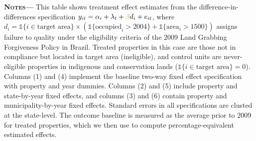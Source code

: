 \documentclass[12pt]{article}
\begin{document}
\begin{center}
\begin{threeparttable}[b]
\begin{tablenotes}[flushleft]
  \item {\justify\singlespacing\footnotesize {\textsc{\textbf{Notes---}}} This table shows treatment effect estimates from the difference-in-differences specification $y_{it}=\alpha_i+\lambda_t+\textcolor{orange}{\beta} d_i+e_{it}$, where $d_i=\mathbb{1}\{i \in \text{target area} \}\times\left(\mathbb{1}\{\text{occupied}_i> 2004 \}+\mathbb{1}\{\text{area}_i> 1500 \}\right)$ assigns failure to quality under the eligibility criteria of the 2009 Land Grabbing Forgiveness Policy in Brazil. Treated properties in this case are those not in compliance but located in target area (ineligible), and control units are never-eligible properties in indigenous and conservation lands ($\mathbb{1}\{i \in \text{target area} \}=0$). Columns (1) and (4) implement the baseline two-way fixed effect specification with property and year dummies. Columns (2) and (5) include property and state-by-year fixed effects, and columns (3) and (6) contain property and municipality-by-year fixed effects. Standard errors in all specifications are clusted at the state-level. The outcome baseline is measured as the average prior to 2009 for treated properties, which we then use to compute percentage-equivalent estimated effects. }
    \end{tablenotes}
\end{threeparttable}
\end{center}

\clearpage
\fi 
\end{document}
